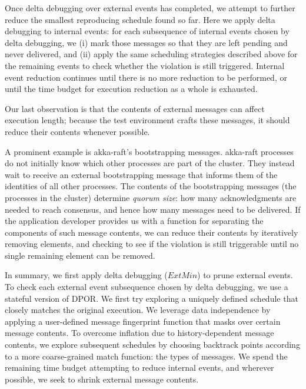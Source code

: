  Once delta debugging over external
events has completed,
we attempt to further reduce the smallest reproducing schedule found so far.
Here we apply delta debugging to internal events: for each subsequence of
internal events chosen by delta debugging, we (i) mark those messages so that they
are left pending and never delivered, and (ii) apply the same scheduling
strategies described above for the remaining events to check whether the
violation is still triggered.
Internal event reduction continues until there is no more reduction to
be performed, or until the time budget for execution reduction as a whole is exhausted.

 Our last observation is that the contents of external messages
can affect execution length; because the test environment crafts these
messages, it should reduce their contents whenever
possible.

A prominent example is akka-raft's bootstrapping messages. akka-raft
processes do not initially know which other processes are part of the cluster.
They instead wait to receive an external bootstrapping message that informs
them of the identities of all other processes. The contents of the bootstrapping
messages (the processes in the cluster) determine {\em quorum
size}: how many acknowledgments are needed to reach consensus, and hence
how many messages need to be delivered. If the application developer
provides us with a function for separating the components of such message
contents, we can reduce their
contents by iteratively removing elements, and checking to see if the violation is still triggerable until
no single remaining element can be removed.

 In summary, we first apply delta debugging ($ExtMin$) to prune external events.
To check each external event subsequence chosen by delta debugging, we use a stateful version of DPOR.
We first try exploring a uniquely defined schedule that closely matches the original execution.
We leverage data independence by applying a
user-defined message fingerprint function that masks over certain message
contents. To overcome inflation due to
history-dependent message contents, we explore subsequent schedules by
choosing backtrack points according to a more coarse-grained match function: the
types of messages. We spend the remaining time budget attempting to reduce internal events, and wherever
possible, we seek to shrink external message contents.

